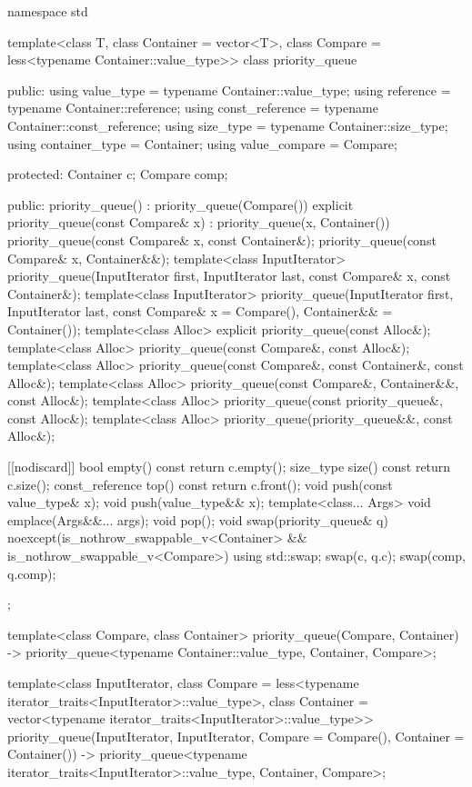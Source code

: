 \begin{codeblock}
namespace std {
  template<class T, class Container = vector<T>,
           class Compare = less<typename Container::value_type>>
  class priority_queue {
  public:
    using value_type      = typename Container::value_type;
    using reference       = typename Container::reference;
    using const_reference = typename Container::const_reference;
    using size_type       = typename Container::size_type;
    using container_type  = Container;
    using value_compare   = Compare;

  protected:
    Container c;
    Compare comp;

  public:
    priority_queue() : priority_queue(Compare()) {}
    explicit priority_queue(const Compare& x) : priority_queue(x, Container()) {}
    priority_queue(const Compare& x, const Container&);
    priority_queue(const Compare& x, Container&&);
    template<class InputIterator>
      priority_queue(InputIterator first, InputIterator last, const Compare& x,
                     const Container&);
    template<class InputIterator>
      priority_queue(InputIterator first, InputIterator last,
                     const Compare& x = Compare(), Container&& = Container());
    template<class Alloc> explicit priority_queue(const Alloc&);
    template<class Alloc> priority_queue(const Compare&, const Alloc&);
    template<class Alloc> priority_queue(const Compare&, const Container&, const Alloc&);
    template<class Alloc> priority_queue(const Compare&, Container&&, const Alloc&);
    template<class Alloc> priority_queue(const priority_queue&, const Alloc&);
    template<class Alloc> priority_queue(priority_queue&&, const Alloc&);

    [[nodiscard]] bool empty() const { return c.empty(); }
    size_type size()  const          { return c.size(); }
    const_reference   top() const    { return c.front(); }
    void push(const value_type& x);
    void push(value_type&& x);
    template<class... Args> void emplace(Args&&... args);
    void pop();
    void swap(priority_queue& q) noexcept(is_nothrow_swappable_v<Container> &&
                                          is_nothrow_swappable_v<Compare>)
      { using std::swap; swap(c, q.c); swap(comp, q.comp); }
  };

  template<class Compare, class Container>
    priority_queue(Compare, Container)
      -> priority_queue<typename Container::value_type, Container, Compare>;

  template<class InputIterator,
           class Compare = less<typename iterator_traits<InputIterator>::value_type>,
           class Container = vector<typename iterator_traits<InputIterator>::value_type>>
    priority_queue(InputIterator, InputIterator, Compare = Compare(), Container = Container())
      -> priority_queue<typename iterator_traits<InputIterator>::value_type, Container, Compare>;

}
\end{codeblock}
